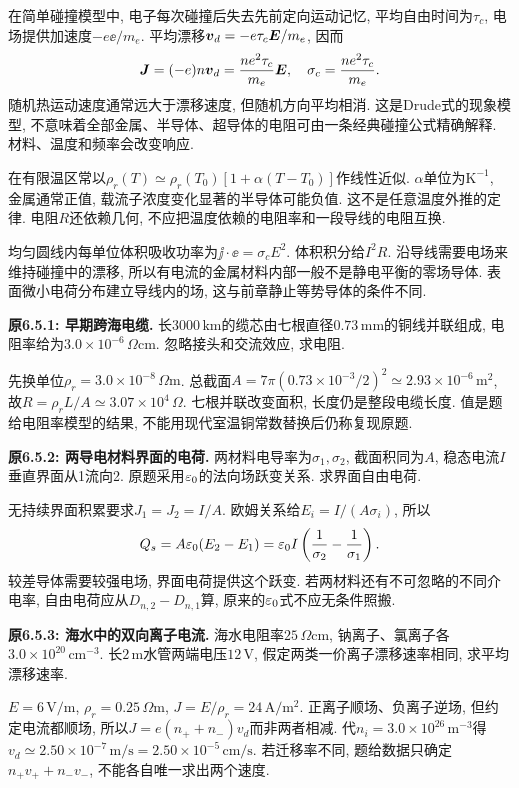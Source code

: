 \label{tb:drude}
在简单碰撞模型中, 电子每次碰撞后失去先前定向运动记忆, 平均自由时间为$\tau_c$, 电场提供加速度$-e\ee/m_e$. 平均漂移$\boldsymbol{v}_d=-e\tau_c\boldsymbol{E}/m_e$, 因而
\[\boldsymbol{J}=(-e)n\boldsymbol{v}_d=\frac{ne^2\tau_c}{m_e}\boldsymbol{E},\quad
\sigma_c=\frac{ne^2\tau_c}{m_e}.\]
随机热运动速度通常远大于漂移速度, 但随机方向平均相消. 这是Drude式的现象模型, 不意味着全部金属、半导体、超导体的电阻可由一条经典碰撞公式精确解释. 材料、温度和频率会改变响应.

在有限温区常以$\rho_r(T)\simeq\rho_r(T_0)[1+\alpha(T-T_0)]$作线性近似. $\alpha$单位为$\mathrm{K^{-1}}$, 金属通常正值, 载流子浓度变化显著的半导体可能负值. 这不是任意温度外推的定律. 电阻$R$还依赖几何, 不应把温度依赖的电阻率和一段导线的电阻互换.

均匀圆线内每单位体积吸收功率为$\jj\cdot\ee=\sigma_cE^2$. 体积积分给$I^2R$. 沿导线需要电场来维持碰撞中的漂移, 所以有电流的金属材料内部一般不是静电平衡的零场导体. 表面微小电荷分布建立导线内的场, 这与前章静止等势导体的条件不同.

\begin{example}
\textbf{原6.5.1: 早期跨海电缆.} 
长$3000\,\mathrm{km}$的缆芯由七根直径$0.73\,\mathrm{mm}$的铜线并联组成, 电阻率给为$3.0\times10^{-6}\,\Omega\mathrm{cm}$. 忽略接头和交流效应, 求电阻.
\end{example}
\begin{solution}
先换单位$\rho_r=3.0\times10^{-8}\,\Omega\mathrm m$. 总截面$A=7\pi(0.73\times10^{-3}/2)^2\simeq2.93\times10^{-6}\,\mathrm{m^2}$, 故$R=\rho_rL/A\simeq3.07\times10^4\,\Omega$. 七根并联改变面积, 长度仍是整段电缆长度. 值是题给电阻率模型的结果, 不能用现代室温铜常数替换后仍称复现原题.
\end{solution}

\begin{example}
\textbf{原6.5.2: 两导电材料界面的电荷.} 
两材料电导率为$\sigma_1,\sigma_2$, 截面积同为$A$, 稳态电流$I$垂直界面从1流向2. 原题采用$\varepsilon_0$的法向场跃变关系. 求界面自由电荷.
\end{example}
\begin{solution}
无持续界面积累要求$J_1=J_2=I/A$. 欧姆关系给$E_i=I/(A\sigma_i)$, 所以
\[Q_s=A\varepsilon_0(E_2-E_1)=\varepsilon_0 I\left(\frac1{\sigma_2}-\frac1{\sigma_1}\right).\]
较差导体需要较强电场, 界面电荷提供这个跃变. 若两材料还有不可忽略的不同介电率, 自由电荷应从$D_{n,2}-D_{n,1}$算, 原来的$\varepsilon_0$式不应无条件照搬.
\end{solution}

\begin{example}
\textbf{原6.5.3: 海水中的双向离子电流.} 
海水电阻率$25\,\Omega\mathrm{cm}$, 钠离子、氯离子各$3.0\times10^{20}\,\mathrm{cm^{-3}}$. 长$2\,\mathrm m$水管两端电压$12\,\mathrm V$, 假定两类一价离子漂移速率相同, 求平均漂移速率.
\end{example}
\begin{solution}
$E=6\,\mathrm{V/m}$, $\rho_r=0.25\,\Omega\mathrm m$, $J=E/\rho_r=24\,\mathrm{A/m^2}$. 正离子顺场、负离子逆场, 但约定电流都顺场, 所以$J=e(n_++n_-)v_d$而非两者相减. 代$n_i=3.0\times10^{26}\,\mathrm{m^{-3}}$得$v_d\simeq2.50\times10^{-7}\,\mathrm{m/s}=2.50\times10^{-5}\,\mathrm{cm/s}$. 若迁移率不同, 题给数据只确定$n_+v_++n_-v_-$, 不能各自唯一求出两个速度.
\end{solution}

